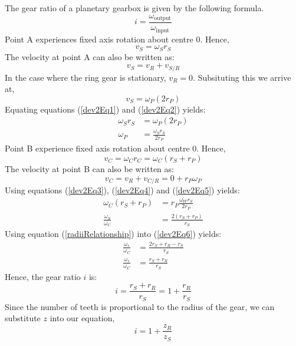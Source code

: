 \documentclass[12pt]{article}
\numberwithin{equation}{section}
\begin{document}
\begin{flushleft}
The gear ratio of a planetary gearbox is given by the following formula.
\begin{equation}
  i = \frac{\omega_{\textrm{output}}}{\omega_{\textrm{input}}}
  \label{gearRatio}
\end{equation}
Point A experiences fixed axis rotation about centre $0$. Hence,
\begin{equation}
  v_S = \omega_S r_S
  \label{dev2Eq1}
\end{equation}
The velocity at point A can also be written as:
\begin{equation}
  v_S = v_R + v_{S/R}
\end{equation}
In the case where the ring gear is stationary, \(v_R = 0\). Subsituting this we arrive at,
\begin{equation}
  v_S = \omega_P(2r_P)
  \label{dev2Eq2}
\end{equation}
Equating equations (\ref{dev2Eq1}) and (\ref{dev2Eq2}) yields:
\begin{align}
  \omega_S r_S &= \omega_P (2r_P)\\
  \omega_P &= \frac{\omega_S r_S}{2r_P} \label{dev2Eq3}
\end{align}
Point B experience fixed axis rotation about centre $0$. Hence, 
\begin{equation}
  v_C = \omega_C r_C = \omega_C (r_S + r_P) \label{dev2Eq4}
\end{equation}
The velocity at point B can also be written as:
\begin{equation}
  v_C = v_R + v_{C/R} = 0 + r_P \omega_P \label{dev2Eq5}
\end{equation}
Using equations (\ref{dev2Eq3}), (\ref{dev2Eq4}) and (\ref{dev2Eq5}) yields:
\begin{align}
  \omega_C (r_S + r_P) &= r_P \frac{\omega_W r_S}{2r_P}\\
  \frac{\omega_S}{\omega_C} &= \frac{2(r_S + r_P)}{r_S} \label{dev2Eq6}
\end{align}
Using equation (\ref{radiiRelationship}) into (\ref{dev2Eq6}) yields:
\begin{align}
  \frac{\omega_s}{\omega_C} &= \frac{2r_S + r_R - r_S}{r_S}\\
  \frac{\omega_s}{\omega_C} &= \frac{r_S + r_R}{r_S}
\end{align}
Hence, the gear ratio $i$ is:
\begin{equation}
  i = \frac{r_S + r_R}{r_S} = 1 + \frac{r_R}{r_S}
\end{equation}
Since the number of teeth is proportional to the radius of the gear, we can substitute $z$ into our equation,
\begin{equation}
  i = 1 + \frac{z_R}{z_S}
\end{equation}

\end{flushleft}
\end{document}

